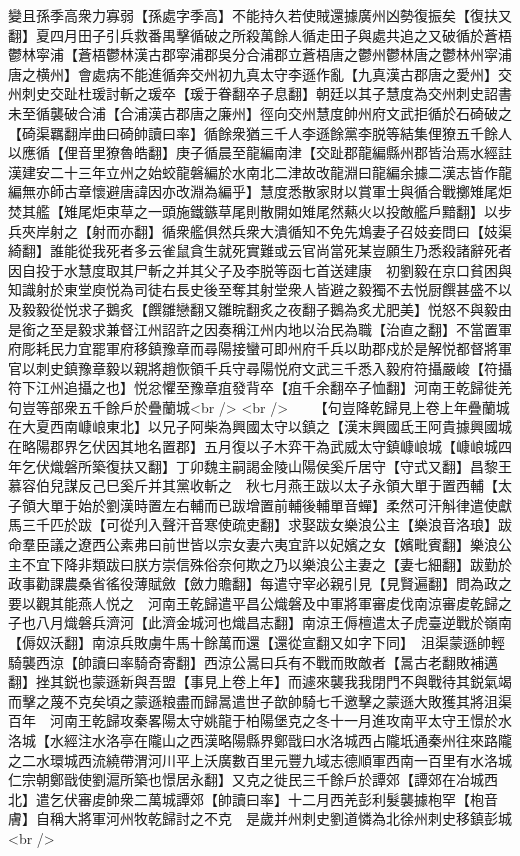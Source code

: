 變且孫季高衆力寡弱【孫處字季高】不能持久若使賊還據廣州凶勢復振矣【復扶又翻】夏四月田子引兵救番禺擊循破之所殺萬餘人循走田子與處共追之又破循於蒼梧鬱林寜浦【蒼梧鬱林漢古郡寜浦郡吳分合浦郡立蒼梧唐之鬱州鬱林唐之鬱林州寜浦唐之横州】會處病不能進循奔交州初九真太守李遜作亂【九真漢古郡唐之愛州】交州刺史交趾杜瑗討斬之瑗卒【瑗于眷翻卒子息翻】朝廷以其子慧度為交州刺史詔書未至循襲破合浦【合浦漢古郡唐之廉州】徑向交州慧度帥州府文武拒循於石碕破之【碕渠羈翻岸曲曰碕帥讀曰率】循餘衆猶三千人李遜餘黨李脱等結集俚獠五千餘人以應循【俚音里獠魯皓翻】庚子循晨至龍編南津【交趾郡龍編縣州郡皆治焉水經註漢建安二十三年立州之始蛟龍磐編於水南北二津故改龍淵曰龍編余據二漢志皆作龍編無亦師古章懷避唐諱因亦改淵為編乎】慧度悉散家財以賞軍士與循合戰擲雉尾炬焚其艦【雉尾炬束草之一頭施鐵鏃草尾則散開如雉尾然爇火以投敵艦戶黯翻】以步兵夾岸射之【射而亦翻】循衆艦俱然兵衆大潰循知不免先鴆妻子召妓妾問曰【妓渠綺翻】誰能從我死者多云雀鼠貪生就死實難或云官尚當死某豈願生乃悉殺諸辭死者因自投于水慧度取其尸斬之并其父子及李脱等函七首送建康　初劉毅在京口貧困與知識射於東堂庾悦為司徒右長史後至奪其射堂衆人皆避之毅獨不去悦厨饌甚盛不以及毅毅從悦求子鵝炙【饌雛戀翻又雛睆翻炙之夜翻子鵝為炙尤肥美】悦怒不與毅由是銜之至是毅求兼督江州詔許之因奏稱江州内地以治民為職【治直之翻】不當置軍府彫耗民力宜罷軍府移鎮豫章而尋陽接蠻可即州府千兵以助郡戍於是解悦都督將軍官以刺史鎮豫章毅以親將趙恢領千兵守尋陽悦府文武三千悉入毅府符攝嚴峻【符攝符下江州追攝之也】悦忿懼至豫章疽發背卒【疽千余翻卒子恤翻】河南王乾歸徙羌句豈等部衆五千餘戶於疊蘭城<br />
<br />
　　【句豈降乾歸見上卷上年疊蘭城在大夏西南嵻㟍東北】以兄子阿柴為興國太守以鎮之【漢末興國氐王阿貴據興國城在略陽郡界乞伏因其地名置郡】五月復以子木弈干為武威太守鎮嵻㟍城【嵻㟍城四年乞伏熾磐所築復扶又翻】丁卯魏主嗣謁金陵山陽侯奚斤居守【守式又翻】昌黎王慕容伯兒謀反己巳奚斤并其黨收斬之　秋七月燕王跋以太子永領大單于置西輔【太子領大單于始於劉漢時置左右輔而已跋增置前輔後輔單音蟬】柔然可汗斛律遣使獻馬三千匹於跋【可從刋入聲汗音寒使疏吏翻】求娶跋女樂浪公主【樂浪音洛琅】跋命羣臣議之遼西公素弗曰前世皆以宗女妻六夷宜許以妃嬪之女【嬪毗賓翻】樂浪公主不宜下降非類跋曰朕方崇信殊俗奈何欺之乃以樂浪公主妻之【妻七細翻】跋勤於政事勸課農桑省徭役薄賦斂【斂力贍翻】每遣守宰必親引見【見賢遍翻】問為政之要以觀其能燕人悦之　河南王乾歸遣平昌公熾磐及中軍將軍審䖍伐南涼審䖍乾歸之子也八月熾磐兵濟河【此濟金城河也熾昌志翻】南涼王傉檀遣太子虎臺逆戰於嶺南【傉奴沃翻】南涼兵敗虜牛馬十餘萬而還【還從宣翻又如字下同】　沮渠蒙遜帥輕騎襲西涼【帥讀曰率騎奇寄翻】西涼公暠曰兵有不戰而敗敵者【暠古老翻敗補邁翻】挫其鋭也蒙遜新與吾盟【事見上卷上年】而遽來襲我我閉門不與戰待其鋭氣竭而擊之蔑不克矣頃之蒙遜粮盡而歸暠遣世子歆帥騎七千邀擊之蒙遜大敗獲其將沮渠百年　河南王乾歸攻秦畧陽太守姚龍于柏陽堡克之冬十一月進攻南平太守王憬於水洛城【水經注水洛亭在隴山之西漢略陽縣界鄭戩曰水洛城西占隴坁通秦州往來路隴之二水環城西流繞帶渭河川平上沃廣數百里元豐九域志德順軍西南一百里有水洛城仁宗朝鄭戩使劉滬所築也憬居永翻】又克之徙民三千餘戶於譚郊【譚郊在冶城西北】遣乞伏審䖍帥衆二萬城譚郊【帥讀曰率】十二月西羌彭利髮襲據枹罕【枹音膚】自稱大將軍河州牧乾歸討之不克　是歲并州刺史劉道憐為北徐州刺史移鎮彭城<br />
